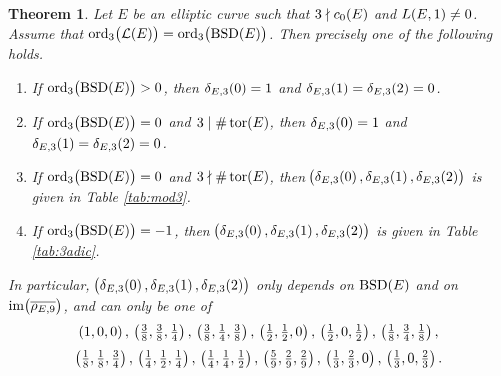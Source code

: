 \documentclass{article}
\theoremstyle{plain}
\newtheorem{theorem}[n]{Theorem}
\theoremstyle{definition}
\newcommand{\BSD}{\operatorname{BSD}}
\newcommand{\im}{\operatorname{im}}
\newcommand{\LLL}{\mathcal{L}}
\newcommand{\ord}{\operatorname{ord}}
\newcommand{\tor}{\operatorname{tor}}
\newcommand{\br}{\!\del}
\begin{document}
\begin{theorem}
\label{thm:density}
Let $ E $ be an elliptic curve such that $ 3 \nmid c_0\br{E} $ and $ L\br{E, 1} \ne 0 $. Assume that $ \ord_3\br{\LLL\br{E}} = \ord_3\br{\BSD\br{E}} $. Then precisely one of the following holds.
\begin{enumerate}
\item If $ \ord_3\br{\BSD\br{E}} > 0 $, then $ \delta_{E, 3}\br{0} = 1 $ and $ \delta_{E, 3}\br{1} = \delta_{E, 3}\br{2} = 0 $.
\item If $ \ord_3\br{\BSD\br{E}} = 0 $ and $ 3 \mid \#\tor\br{E} $, then $ \delta_{E, 3}\br{0} = 1 $ and $ \delta_{E, 3}\br{1} = \delta_{E, 3}\br{2} = 0 $.
\item If $ \ord_3\br{\BSD\br{E}} = 0 $ and $ 3 \nmid \#\tor\br{E} $, then $ \br{\delta_{E, 3}\br{0}, \delta_{E, 3}\br{1}, \delta_{E, 3}\br{2}} $ is given in Table \ref{tab:mod3}.
\item If $ \ord_3\br{\BSD\br{E}} = -1 $, then $ \br{\delta_{E, 3}\br{0}, \delta_{E, 3}\br{1}, \delta_{E, 3}\br{2}} $ is given in Table \ref{tab:3adic}.
\end{enumerate}
In particular, $ \br{\delta_{E, 3}\br{0}, \delta_{E, 3}\br{1}, \delta_{E, 3}\br{2}} $ only depends on $ \BSD\br{E} $ and on $ \im\br{\overline{\rho_{E, 9}}} $, and can only be one of
$$ \br{1, 0, 0}, \ \br{\tfrac{3}{8}, \tfrac{3}{8}, \tfrac{1}{4}}, \ \br{\tfrac{3}{8}, \tfrac{1}{4}, \tfrac{3}{8}}, \ \br{\tfrac{1}{2}, \tfrac{1}{2}, 0}, \ \br{\tfrac{1}{2}, 0, \tfrac{1}{2}}, \ \br{\tfrac{1}{8}, \tfrac{3}{4}, \tfrac{1}{8}}, $$
$$ \br{\tfrac{1}{8}, \tfrac{1}{8}, \tfrac{3}{4}}, \ \br{\tfrac{1}{4}, \tfrac{1}{2}, \tfrac{1}{4}}, \ \br{\tfrac{1}{4}, \tfrac{1}{4}, \tfrac{1}{2}}, \ \br{\tfrac{5}{9}, \tfrac{2}{9}, \tfrac{2}{9}}, \ \br{\tfrac{1}{3}, \tfrac{2}{3}, 0}, \ \br{\tfrac{1}{3}, 0, \tfrac{2}{3}}. $$
\end{theorem}
\end{document}
